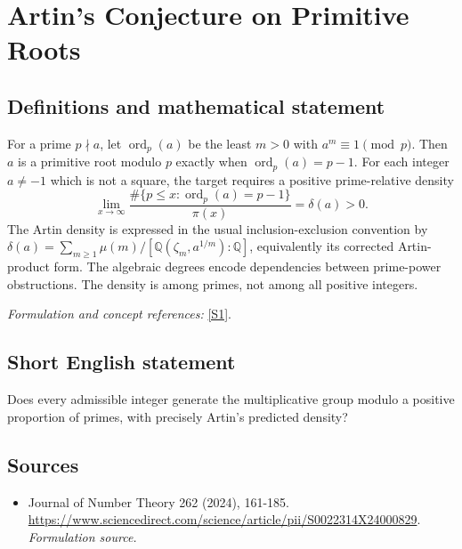 \documentclass[11pt]{article}
\begin{document}
\section*{\texorpdfstring{Artin's Conjecture on Primitive Roots}{Artin's Conjecture on Primitive Roots}}\label{statement}
\subsection{Definitions and mathematical statement}
For a prime $p\nmid a$, let $\operatorname{ord}_p(a)$ be the least $m>0$ with $a^m\equiv1\pmod p$. Then $a$ is a primitive root modulo $p$ exactly when $\operatorname{ord}_p(a)=p-1$. For each integer $a\ne-1$ which is not a square, the target requires a positive prime-relative density
\[
 \lim_{x\to\infty}\frac{\#\{p\le x:\operatorname{ord}_p(a)=p-1\}}{\pi(x)}=\delta(a)>0.
\]
The Artin density is expressed in the usual inclusion-exclusion convention by
$\delta(a)=\sum_{m\ge1}\mu(m)/[{\mathbb{Q}}(\zeta_m,a^{1/m}):{\mathbb{Q}}]$, equivalently its corrected Artin-product form. The algebraic degrees encode dependencies between prime-power obstructions. The density is among primes, not among all positive integers.
\par\smallskip\textit{Formulation and concept references:} \href{https://www.sciencedirect.com/science/article/pii/S0022314X24000829}{[S1]}.

\subsection{Short English statement}
Does every admissible integer generate the multiplicative group modulo a positive proportion of primes, with precisely Artin's predicted density?
\subsection{Sources}
\begin{itemize}
\item[S1]Journal of Number Theory 262 (2024), 161-185.
\url{https://www.sciencedirect.com/science/article/pii/S0022314X24000829}.
\textit{Formulation source.}
\end{itemize}
\end{document}

